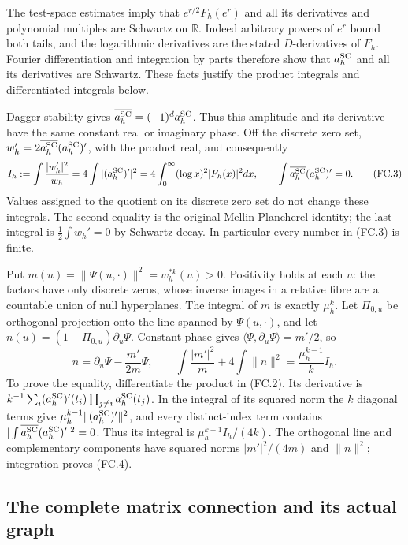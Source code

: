 The test-space estimates imply that \(e^{r/2}F_h(e^r)\) and all
its derivatives and polynomial multiples are Schwartz on \(\mathbb R\).
Indeed arbitrary powers of \(e^r\) bound both tails, and the
logarithmic derivatives are the stated \(D\)-derivatives of \(F_h\).
Fourier differentiation and integration by parts therefore show that
\(a_h^{\rm SC}\) and all its derivatives are Schwartz. These facts
justify the product integrals and differentiated integrals below.

Dagger stability gives \(\overline{a_h^{\rm SC}}=(-1)^d a_h^{\rm SC}\).
Thus this amplitude and its derivative have the same constant real or
imaginary phase. Off the discrete zero set,
\(w_h'=2\overline{a_h^{\rm SC}}(a_h^{\rm SC})'\), with the
product real, and consequently
\[
 I_h:=\int\frac{|w_h'|^2}{w_h}
   =4\int|(a_h^{\rm SC})'|^2
   =4\int_0^\infty(\log x)^2|F_h(x)|^2dx,
 \qquad \int\overline{a_h^{\rm SC}}(a_h^{\rm SC})'=0.
 \tag{FC.3}
\]
Values assigned to the quotient on its discrete zero set do not
change these integrals. The second equality is the original Mellin
Plancherel identity; the last integral is \(\frac12\int w_h'=0\)
by Schwartz decay. In particular every number in (FC.3) is finite.

Put \(m(u)=\|\Psi(u,\cdot)\|^2=w_h^{*k}(u)>0\). Positivity holds
at each \(u\): the factors have only discrete zeros, whose inverse
images in a relative fibre are a countable union of null hyperplanes.
The integral of \(m\) is exactly \(\mu_h^k\). Let \(\Pi_{0,u}\)
be orthogonal projection onto the line spanned by \(\Psi(u,\cdot)\),
and let \(n(u)=(1-\Pi_{0,u})\partial_u\Psi\). Constant phase gives
\(\langle\Psi,\partial_u\Psi\rangle=m'/2\), so
\[
 n=\partial_u\Psi-\frac{m'}{2m}\Psi,\qquad
 \boxed{\int\frac{|m'|^2}{m}+4\int\|n\|^2
                   =\frac{\mu_h^{k-1}}k I_h.}
 \tag{FC.4}
\]
To prove the equality, differentiate the product in (FC.2).
Its derivative is \(k^{-1}\sum_i(a_h^{\rm SC})'(t_i)
\prod_{j\ne i}a_h^{\rm SC}(t_j)\). In the integral of its squared
norm the \(k\) diagonal terms give
\(\mu_h^{k-1}\|(a_h^{\rm SC})'\|^2\), and every distinct-index
term contains \(|\int\overline{a_h^{\rm SC}}(a_h^{\rm SC})'|^2=0\).
Thus its integral is \(\mu_h^{k-1}I_h/(4k)\). The orthogonal
line and complementary components have squared norms
\(|m'|^2/(4m)\) and \(\|n\|^2\); integration proves (FC.4).

\subsection{The complete matrix connection and its actual graph}

